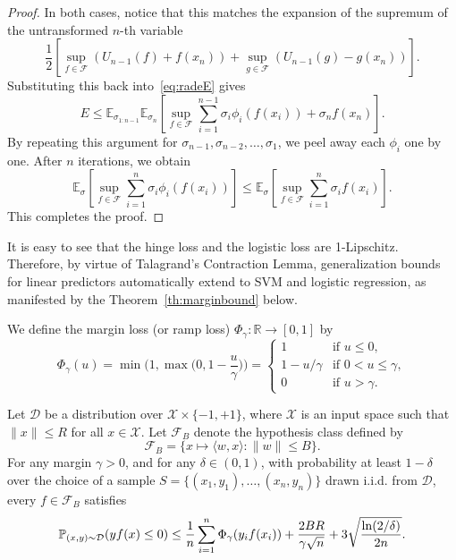 \begin{proof}
In both cases, notice that this matches the expansion of the supremum of the untransformed $n$-th variable
$$\frac{1}{2} \left[ \sup_{f \in \mathcal{F}} (U_{n-1}(f) + f(x_n)) + \sup_{g \in \mathcal{F}} (U_{n-1}(g) - g(x_n)) \right].$$
Substituting this back into~\eqref{eq:radeE} gives
$$E \leq \mathbb{E}_{\sigma_{1:n-1}} \mathbb{E}_{\sigma_n} \left[ \sup_{f \in \mathcal{F}} \sum_{i=1}^{n-1} \sigma_i \phi_i(f(x_i)) + \sigma_n f(x_n) \right].$$
By repeating this argument for $\sigma_{n-1}, \sigma_{n-2}, \dots, \sigma_1$, we peel away each $\phi_i$ one by one. After $n$ iterations, we obtain
$$\mathbb{E}_{\sigma} \left[ \sup_{f \in \mathcal{F}} \sum_{i=1}^n \sigma_i \phi_i(f(x_i)) \right] \leq \mathbb{E}_{\sigma} \left[ \sup_{f \in \mathcal{F}} \sum_{i=1}^n \sigma_i f(x_i) \right].$$
This completes the proof.

\end{proof}



It is easy to see that the hinge loss and the logistic loss are 1-Lipschitz.
Therefore, by virtue of Talagrand's Contraction Lemma, generalization bounds for linear predictors automatically extend to SVM and logistic regression, as manifested by the Theorem~\ref{th:marginbound} below.

We define the margin loss (or ramp loss) $\Phi_\gamma: \mathbb{R} \to [0, 1]$  by
$$\Phi_\gamma(u) = \min\Big(1, \max\big(0, 1 - \frac{u}{\gamma}\big)\Big) = \begin{cases} 1 & \text{if } u \leq 0, \\ 1 - u/\gamma & \text{if } 0 < u \leq \gamma, \\ 0 & \text{if } u > \gamma. \end{cases}$$


\begin{theorem}\label{th:marginbound}
Let $\mathcal{D}$ be a distribution over $\mathcal{X} \times \{-1, +1\}$, where $\mathcal{X}$ is an input space such that $\|x\| \leq R$ for all $x \in \mathcal{X}$. Let $\mathcal{F}_B$ denote the hypothesis class defined by
$$\mathcal{F}_B = \{ x \mapsto \langle w, x \rangle : \|w\| \leq B \}.$$
For any margin $\gamma > 0$, and for any  $\delta \in (0, 1)$, with probability at least $1 - \delta$ over the choice of a sample $S = \{(x_1, y_1), \dots, (x_n, y_n)\}$ drawn i.i.d. from $\mathcal{D}$, every $f \in \mathcal{F}_B$ satisfies
$$\P_{(x,y) \sim \mathcal{D}}(y f(x) \leq 0) \leq \frac{1}{n} \sum_{i=1}^n \Phi_\gamma(y_i f(x_i)) + \frac{2BR}{\gamma \sqrt{n}} + 3 \sqrt{\frac{\ln(2/\delta)}{2n}}.$$

\end{theorem}

